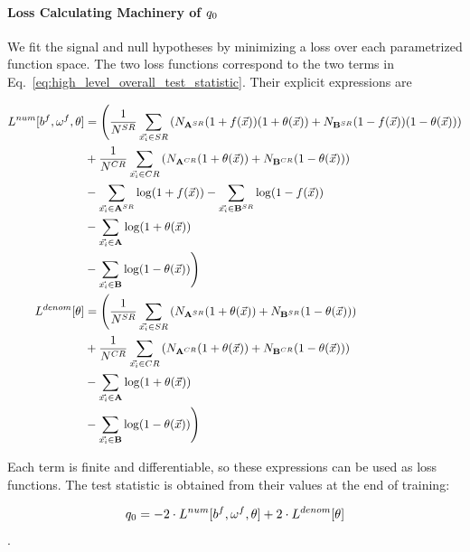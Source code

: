 \documentclass[paper/ddppaper2.tex]{subfiles}
\begin{document}
\paragraph{Loss Calculating Machinery of \texorpdfstring{${q_{0}}$}{the Test Statistic}}

We fit the signal and null hypotheses by minimizing a loss over each parametrized function space. The two loss functions correspond to the two terms in Eq.~\ref{eq:high_level_overall_test_statistic}. Their explicit expressions are

\begin{wideequations}
\begin{equation}
\label{eq:discrete_loss_functions}
\begin{aligned}
L^{num}[b^f, \omega^f, \nparam] &= \Bigg(
    \dfrac{1}{N^{SR}} \sum\limits_{\event \in SR} \left(
        {N_\srdataset{A}} (1 + f(\anyevent)) (1 + {\nparam(\anyevent)})
        + {N_\srdataset{B}} (1 - f(\anyevent)) (1 - {\nparam(\anyevent)})
    \right) \\&
    + \dfrac{1}{N^{CR}} \sum\limits_{\event \in CR} \left(
        {N_\crdataset{A}} (1 + {\nparam(\anyevent)})
        + {N_\crdataset{B}} (1 - {\nparam(\anyevent)})
    \right)
    \\&
    - \sum\limits_{\event \in \srdataset{A}} \log(1 + f(\anyevent))
    - \sum\limits_{\event \in \srdataset{B}} \log(1 - f(\anyevent)) \\&
    - \sum\limits_{\event \in \dataset{A}} \log(1 + {\nparam(\anyevent)})
    \\&- \sum\limits_{\event \in \dataset{B}} \log(1 - {\nparam(\anyevent)})
\Bigg)
\\
L^{denom}[\nparam] &= \Bigg(
    \dfrac{1}{N^{SR}} \sum\limits_{\event \in SR} \left(
        {N_\srdataset{A}} (1 + {\nparam(\anyevent)})
        + {N_\srdataset{B}} (1 - {\nparam(\anyevent)})
    \right) \\&
    + \dfrac{1}{N^{CR}} \sum\limits_{\event \in CR} \left(
        {N_\crdataset{A}} (1 + {\nparam(\anyevent)})
        + {N_\crdataset{B}} (1 - {\nparam(\anyevent)})
    \right)
    \\&
    - \sum\limits_{\event \in \dataset{A}} \log(1 + {\nparam(\anyevent)})
    \\&- \sum\limits_{\event \in \dataset{B}} \log(1 - {\nparam(\anyevent)})
\Bigg)
\end{aligned}
\end{equation}
\end{wideequations}

Each term is finite and differentiable, so these expressions can be used as loss functions. The test statistic is obtained from their values at the end of training:

\begin{equation}
\label{eq:t_value_from_two_losses}
    \invllratio = -2 \cdot L^{num}[b^f, \omega^f, \nparam] + 2 \cdot L^{denom}[\nparam]
\end{equation}.
\end{document}
